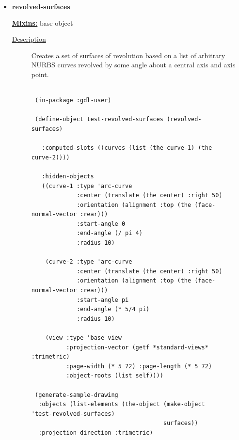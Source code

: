 \documentclass [11pt]{book}
\begin{document}
\begin{itemize}
\item {}
\label{prim:revolved-surfaces}
\textbf{revolved-surfaces}


\textbf{
\underline{Mixins:}} base-object





\begin{description}

\item [
\underline{Description}]


Creates a set of surfaces of revolution based on a list of arbitrary NURBS curves revolved by some angle about
a central axis and axis point.



\end{description}




\begin{figure}
\begin{lrbox}{\boxedverb}
\begin{minipage}{\linewidth}
{\small

\begin{verbatim}

 (in-package :gdl-user)

 (define-object test-revolved-surfaces (revolved-surfaces)

   :computed-slots ((curves (list (the curve-1) (the curve-2))))
   
   :hidden-objects 
   ((curve-1 :type 'arc-curve
             :center (translate (the center) :right 50)
             :orientation (alignment :top (the (face-normal-vector :rear)))
             :start-angle 0
             :end-angle (/ pi 4)
             :radius 10)
    
    (curve-2 :type 'arc-curve
             :center (translate (the center) :right 50)
             :orientation (alignment :top (the (face-normal-vector :rear)))
             :start-angle pi
             :end-angle (* 5/4 pi)
             :radius 10)
    
    (view :type 'base-view
          :projection-vector (getf *standard-views* :trimetric)
          :page-width (* 5 72) :page-length (* 5 72)
          :object-roots (list self))))
 
 (generate-sample-drawing 
  :objects (list-elements (the-object (make-object 'test-revolved-surfaces)
                                      surfaces))
  :projection-direction :trimetric)
 
  
\end{verbatim}}
\end{minipage}
\end{lrbox}
\fbox{\usebox{\boxedverb}}


\end{figure}
\end{itemize}
\end{document}
